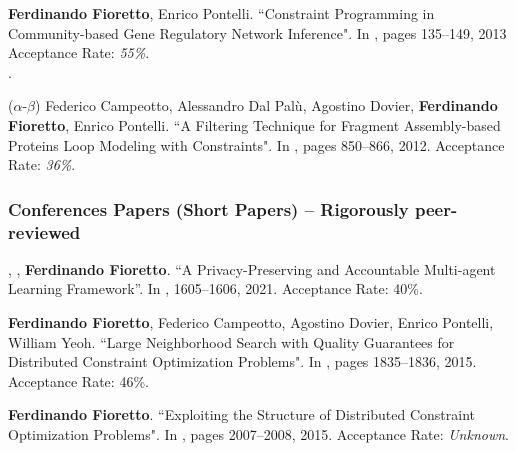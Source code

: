 
\item
	{\bf Ferdinando Fioretto}, Enrico Pontelli. 
	{``Constraint Programming in Community-based Gene Regulatory Network Inference"}. 
	In \procCMSB, pages 135--149, 2013
	Acceptance Rate: {\it 55\%}. \\
	.


\item 
	($\alpha$-$\beta$) 
	Federico Campeotto, Alessandro Dal Pal\`{u}, Agostino Dovier, {\bf Ferdinando Fioretto}, Enrico Pontelli. 
	{``A Filtering Technique for Fragment Assembly-based Proteins Loop Modeling with Constraints"}. 
	  In \procCP, pages 850--866, 2012.
	Acceptance Rate: {\it 36\%}.

\endEnum

\subsubsection*{\sc Conferences Papers (Short Papers) -- Rigorously peer-reviewed}
\renewcommand{\labelenumi}{c\theenumi.} 
\beginEnum
\item 
	, , {\bf Ferdinando Fioretto}. 
	``A Privacy-Preserving and Accountable Multi-agent Learning Framework''. 
	In \procAAMAS, 1605--1606, 2021.
	Acceptance Rate: 40\%.

\item 
	{\bf Ferdinando Fioretto}, Federico Campeotto, Agostino Dovier, Enrico Pontelli, William Yeoh.
	{``Large Neighborhood Search with Quality Guarantees for Distributed Constraint Optimization Problems"}. %
	In \procAAMAS, pages 1835--1836, 2015.
	Acceptance Rate: 46\%.

\item 
	{\bf Ferdinando Fioretto}. 
	{``Exploiting the Structure of Distributed Constraint Optimization Problems"}. 
	In \procAAMAS, %
	pages 2007--2008, 2015.
	Acceptance Rate: {\it Unknown}.


